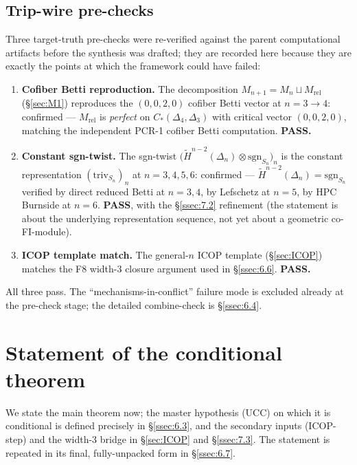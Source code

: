 \documentclass[11pt,reqno]{amsart}
\theoremstyle{plain}
\theoremstyle{definition}
\newcommand{\Hred}{\widetilde H}
\newcommand{\sgn}{\mathrm{sgn}}
\newcommand{\triv}{\mathrm{triv}}
\newcommand{\Mrel}{M_{\mathrm{rel}}}
\newcommand{\UCC}{\textup{(UCC)}}
\newcommand{\ICOPstep}{\textup{(ICOP-step)}}
\begin{document}
\subsection{Trip-wire pre-checks}\label{ssec:tripwires}
Three target-truth pre-checks were re-verified against the parent
computational artifacts before the synthesis was drafted; they are
recorded here because they are exactly the points at which the
framework could have failed:
\begin{enumerate}[leftmargin=2em,label=(\alph*)]
  \item \textbf{Cofiber Betti reproduction.} The decomposition
        $M_{n+1}=M_n\sqcup\Mrel$ (\S\ref{sec:M1}) reproduces the
        $(0,0,2,0)$ cofiber Betti vector at $n=3\to4$: confirmed ---
        $\Mrel$ is \emph{perfect} on $C_*(\Delta_4,\Delta_3)$ with
        critical vector $(0,0,2,0)$, matching the independent
        PCR-1 cofiber Betti computation. \textbf{PASS.}
  \item \textbf{Constant sgn-twist.} The sgn-twist
        $\bigl(\Hred^{n-2}(\Delta_n)\otimes\sgn_{S_n}\bigr)_n$ is the
        constant representation $(\triv_{S_n})_n$ at $n=3,4,5,6$:
        confirmed --- $\Hred^{n-2}(\Delta_n)=\sgn_{S_n}$ verified by
        direct reduced Betti at $n=3,4$, by Lefschetz at $n=5$, by HPC
        Burnside at $n=6$. \textbf{PASS}, with the
        \S\ref{ssec:7.2} refinement (the statement is about the
        underlying representation sequence, not yet about a geometric
        co-FI-module).
  \item \textbf{ICOP template match.} The general-$n$ ICOP template
        (\S\ref{sec:ICOP}) matches the F8 width-3 closure argument
        used in \S\ref{ssec:6.6}. \textbf{PASS.}
\end{enumerate}
All three pass. The ``mechanisms-in-conflict'' failure mode is excluded
already at the pre-check stage; the detailed combine-check is
\S\ref{ssec:6.4}.

\section{Statement of the conditional theorem}\label{sec:thm}
\label{sec:statement}

We state the main theorem now; the master hypothesis \UCC{} on which it
is conditional is defined precisely in \S\ref{ssec:6.3}, and the secondary
inputs \ICOPstep{} and the width-3 bridge in \S\ref{sec:ICOP} and
\S\ref{ssec:7.3}. The statement is repeated in its final, fully-unpacked
form in \S\ref{ssec:6.7}.
\end{document}
